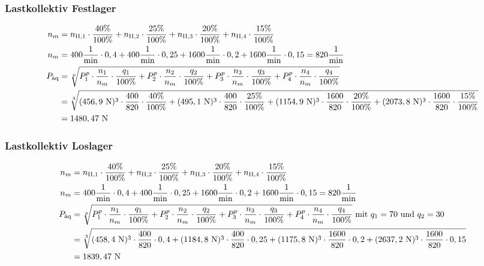 \subsubsection{Lastkollektiv Festlager}
\begin{align*}
	n_m &= n_{\mathord{\mathrm{II}},1} \cdot \frac{40 \%}{100 \%} + n_{\mathord{\mathrm{II}},2} \cdot \frac{25 \%}{100 \%} + n_{\mathord{\mathrm{II}},3} \cdot \frac{20 \%}{100 \%} + n_{\mathord{\mathrm{II}},4} \cdot \frac{15 \%}{100 \%} \\
	n_m &= 400 \frac{1}{\text{min}} \cdot 0,4 + 400 \frac{1}{\text{min}} \cdot 0,25 +1600 \frac{1}{\text{min}} \cdot 0,2 + 1600 \frac{1}{\text{min}} \cdot 0,15 = 820 \frac{1}{\text{min}} \\
	P_{\text{äq}} &= \sqrt[p]{P_1 ^{p} \cdot \frac{n_1}{n_m} \cdot \frac{q_1}{100\% } + P_2 ^{p} \cdot \frac{n_2}{n_m} \cdot \frac{q_2}{100 \%} + P_3 ^{p} \cdot \frac{n_3}{n_m} \cdot \frac{q_3}{100\% } + P_4 ^{p} \cdot \frac{n_4}{n_m} \cdot \frac{q_4}{100 \%}} \\
	&= \sqrt[3]{(456,9 \text{ N}) ^{3} \cdot \frac{400}{820} \cdot \frac{40 \%}{100 \%} +(495,1 \text{ N} )^{3} \cdot \frac{400}{820} \cdot \frac{25 \%}{100\% }+(1154,9 \text{ N} )^{3} \cdot \frac{1600}{820} \cdot \frac{20 \%}{100\% } +(2073,8 \text{ N} )^{3} \cdot \frac{1600}{820} \cdot \frac{15 \%}{100\% }} \\
	&= 1480,47 \text{ N}
\end{align*}
\subsubsection{Lastkollektiv Loslager}
\begin{align*}
	n_m &= n_{\mathord{\mathrm{II}},1} \cdot \frac{40 \%}{100 \%} + n_{\mathord{\mathrm{II}},2} \cdot \frac{25 \%}{100 \%} + n_{\mathord{\mathrm{II}},3} \cdot \frac{20 \%}{100 \%} + n_{\mathord{\mathrm{II}},4} \cdot \frac{15 \%}{100 \%} \\
	n_m &= 400 \frac{1}{\text{min}} \cdot 0,4 + 400 \frac{1}{\text{min}} \cdot 0,25 + 1600 \frac{1}{\text{min}} \cdot 0,2 + 1600 \frac{1}{\text{min}} \cdot 0,15 = 820 \frac{1}{\text{min}} \\
	P_{\text{äq}} &= \sqrt[p]{P_1 ^{p} \cdot \frac{n_1}{n_m} \cdot \frac{q_1}{100\% } + P_2 ^{p} \cdot \frac{n_2}{n_m} \cdot \frac{q_2}{100 \%} +P_3 ^{p} \cdot \frac{n_3}{n_m} \cdot \frac{q_3}{100\% } + P_4 ^{p} \cdot \frac{n_4}{n_m} \cdot \frac{q_4}{100 \%}} \text{ mit $q_1 = 70$ und $q_2= 30$} \\
	&= \sqrt[3]{(458,4 \text{ N}) ^{3} \cdot \frac{400}{820} \cdot 0,4 +(1184,8 \text{ N} )^{3} \cdot \frac{400}{820} \cdot 0,25+(1175,8 \text{ N} )^{3} \cdot \frac{1600}{820} \cdot 0,2 +(2637,2 \text{ N} )^{3} \cdot \frac{1600}{820} \cdot 0,15} \\
	&= 1839,47 \text{ N}
\end{align*}

